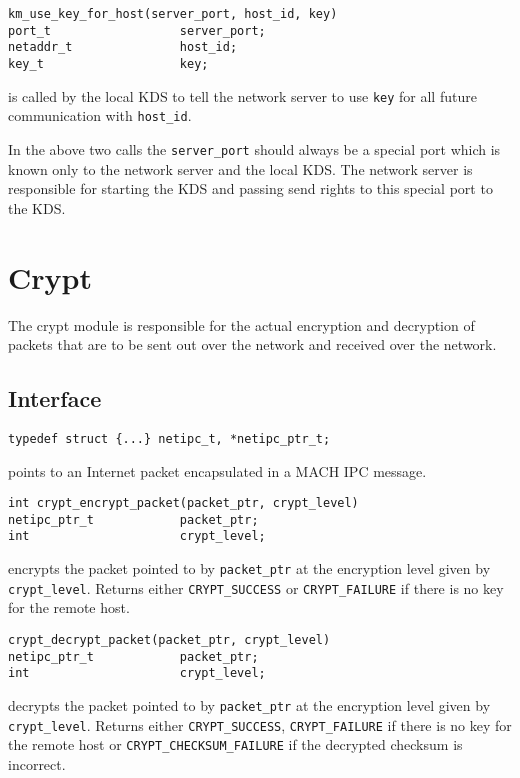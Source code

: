 \begin{verbatim}
km_use_key_for_host(server_port, host_id, key)
port_t                  server_port;
netaddr_t               host_id;
key_t                   key;
\end{verbatim}
is called by the local KDS to tell the network server to use \verb"key" for
all future communication with \verb"host_id".

In the above two calls the \verb"server_port" should always be a special
port which is known only to the network server and the local KDS.  The
network server is responsible for starting the KDS and passing send rights
to this special port to the KDS.

\section{Crypt}
The crypt module is responsible for the actual encryption and decryption of
packets that are to be sent out over the network and received over the
network.

\subsection{Interface}
\begin{verbatim}
typedef struct {...} netipc_t, *netipc_ptr_t;
\end{verbatim}
points to an Internet packet encapsulated in a MACH IPC message.

\begin{verbatim}
int crypt_encrypt_packet(packet_ptr, crypt_level)
netipc_ptr_t            packet_ptr;
int                     crypt_level;
\end{verbatim}
encrypts the packet pointed to by \verb"packet_ptr" at the encryption level
given by \verb"crypt_level".  Returns either \verb"CRYPT_SUCCESS" or
\verb"CRYPT_FAILURE" if there is no key for the remote host.

\begin{verbatim}
crypt_decrypt_packet(packet_ptr, crypt_level)
netipc_ptr_t            packet_ptr;
int                     crypt_level;
\end{verbatim}
\begin{sloppy}
decrypts the packet pointed to by \verb"packet_ptr" at the encryption level
given by \verb"crypt_level".  Returns either \verb"CRYPT_SUCCESS",
\verb"CRYPT_FAILURE" if there is no key for the remote host or
\verb"CRYPT_"\linebreak[0]\verb"CHECKSUM_"\linebreak[0]\verb"FAILURE"
if the decrypted checksum is incorrect.
\end{sloppy}

